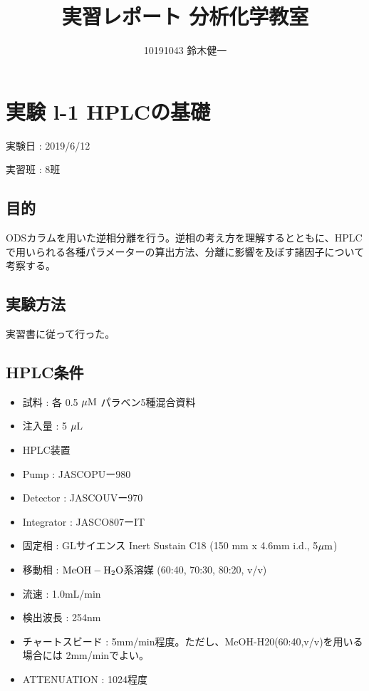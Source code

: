 \documentclass[a4paper,papersize,dvipdfmx]{jsarticle}
\begin{document}
\title{実習レポート 分析化学教室}
\author{10191043 鈴木健一}
\date{}
\maketitle

\small


\section*{実験 l-1 HPLCの基礎}
\begin{flushright}
実験日 : 2019/6/12

実習班 : 8班
\end{flushright}

\subsection*{目的}
ODSカラムを用いた逆相分離を行う。逆相の考え方を理解するとともに、HPLCで用いられる各種パラメーターの算出方法、分離に影響を及ぼす諸因子について考察する。

\subsection*{実験方法}
実習書に従って行った。

\subsection*{HPLC条件}
\begin{itemize}
\item 試料 : 各 0.5 $\rm \mu M$ パラベン5種混合資料
\item 注入量 : 5 $\rm \mu L$
\item HPLC装置
\item Pump : JASCOPUー980
\item Detector : JASCOUVー970
\item Integrator : JASCO807ーIT
\item 固定相 : GLサイエンス Inert Sustain C18 (150 mm x 4.6mm i.d., 5$\rm \mu m$)
\item 移動相 : $\rm MeOH-H_2O$系溶媒 (60:40, 70:30, 80:20, v/v)
\item 流速 : 1.0mL/min
\item 検出波長 : 254nm
\item チャートスビード : 5mm/min程度。ただし、MeOH-H20(60:40,v/v)を用いる場合には 2mm/minでよい。
\item ATTENUATION : 1024程度

\end{itemize}
\end{document}
